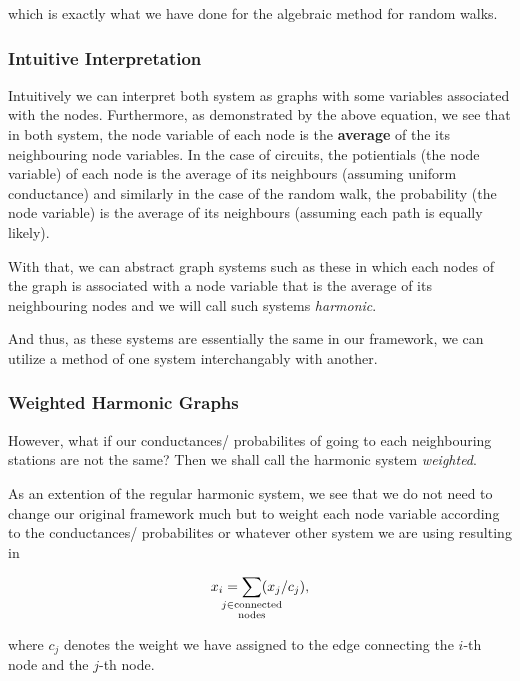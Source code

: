 \documentclass[]{article}
\begin{document}
which is exactly what we have done for the algebraic method for random
walks.

\subsubsection{Intuitive Interpretation}\label{intuitive-interpretation}

Intuitively we can interpret both system as graphs with some variables
associated with the nodes. Furthermore, as demonstrated by the above
equation, we see that in both system, the node variable of each node is
the \textbf{average} of the its neighbouring node variables. In the case
of circuits, the potientials (the node variable) of each node is the
average of its neighbours (assuming uniform conductance) and similarly
in the case of the random walk, the probability (the node variable) is
the average of its neighbours (assuming each path is equally likely).

With that, we can abstract graph systems such as these in which each
nodes of the graph is associated with a node variable that is the
average of its neighbouring nodes and we will call such systems
\emph{harmonic}.

And thus, as these systems are essentially the same in our framework, we
can utilize a method of one system interchangably with another.

\subsubsection{Weighted Harmonic Graphs}\label{weighted-harmonic-graphs}

However, what if our conductances/ probabilites of going to each
neighbouring stations are not the same? Then we shall call the harmonic
system \emph{weighted}.

As an extention of the regular harmonic system, we see that we do not
need to change our original framework much but to weight each node
variable according to the conductances/ probabilites or whatever other
system we are using resulting in

\begin{equation}
x_i = \sum_{\mathclap{\substack{j \in \text{connected}\\ \text{nodes}}}} (x_j/ c_j),
\end{equation}

where \(c_j\) denotes the weight we have assigned to the edge connecting
the \(i\)-th node and the \(j\)-th node.
\end{document}
